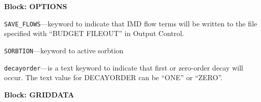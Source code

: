 
\item \textbf{Block: OPTIONS}

\begin{description}
\item \texttt{SAVE\_FLOWS}---keyword to indicate that IMD flow terms will be written to the file specified with ``BUDGET FILEOUT'' in Output Control.

\item \texttt{SORBTION}---keyword to active sorbtion

\item \texttt{decayorder}---is a text keyword to indicate that first or zero-order decay will occur.  The text value for DECAYORDER can be ``ONE'' or ``ZERO''.

\end{description}
\item \textbf{Block: GRIDDATA}

